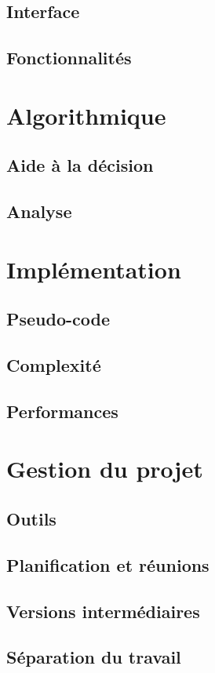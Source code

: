 \documentclass[a4paper,11pt]{article}
\begin{document}
  \subsection{Interface}
  \subsection{Fonctionnalités}
\section{Algorithmique}
  \subsection{Aide à la décision}
  \subsection{Analyse}
\section{Implémentation}
  \subsection{Pseudo-code}
  \subsection{Complexité}
  \subsection{Performances}
\section{Gestion du projet}
  \subsection{Outils}
  \subsection{Planification et réunions}
  \subsection{Versions intermédiaires}
  \subsection{Séparation du travail}
\end{document}
